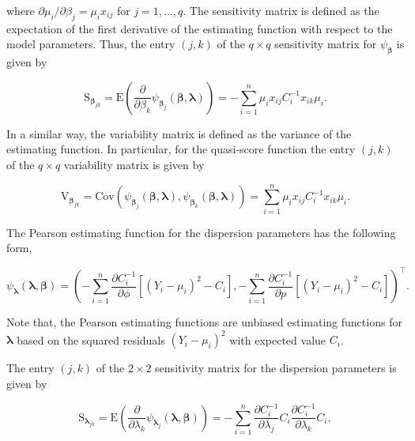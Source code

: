 \documentclass[9pt,a5paper,]{book}
\theoremstyle{definition}
\theoremstyle{definition}
\theoremstyle{remark}
\begin{document}
where \(\partial \mu_i/\partial \beta_j = \mu_i x_{ij}\) for
\(j = 1, \ldots, q\). The sensitivity matrix is defined as the
expectation of the first derivative of the estimating function with
respect to the model parameters. Thus, the entry \((j,k)\) of the
\(q \times q\) sensitivity matrix for \(\psi_{\boldsymbol{\beta}}\) is
given by

\begin{equation}
\mathrm{S}_{\boldsymbol{\beta}_{jk}} = \mathrm{E}\left ( \frac{\partial}{\partial \beta_k} \psi_{\boldsymbol{\beta}_j}(\boldsymbol{\beta}, \boldsymbol{\lambda})  \right ) = -\sum_{i=1}^n \mu_i x_{ij} C^{-1}_i x_{ik} \mu_i.
\label{eq:Sbeta}
\end{equation}

In a similar way, the variability matrix is defined as the variance of
the estimating function. In particular, for the quasi-score function the
entry \((j,k)\) of the \(q \times q\) variability matrix is given by

\begin{equation*}
\label{Vbeta}
\mathrm{V}_{\boldsymbol{\beta}_{jk}} = \mathrm{Cov}(\psi_{\boldsymbol{\beta}_j}(\boldsymbol{\beta}, \boldsymbol{\lambda}),\psi_{\boldsymbol{\beta}_k}(\boldsymbol{\beta}, \boldsymbol{\lambda})) = \sum_{i=1}^n \mu_i x_{ij} C^{-1}_i x_{ik} \mu_i.
\end{equation*}

The Pearson estimating function for the dispersion parameters has the
following form,

\begin{equation*}
\label{Pearson}
\psi_{\boldsymbol{\lambda}}(\boldsymbol{\lambda}, \boldsymbol{\beta}) = \left (-\sum_{i=1}^n \frac{\partial C^{-1}_i}{\partial \phi} \left [ (Y_i - \mu_i)^2 - C_i \right ], -\sum_{i=1}^n \frac{\partial C^{-1}_i}{\partial p}  \left [ (Y_i - \mu_i)^2 - C_i \right ]  \right )^\top.
\end{equation*}

Note that, the Pearson estimating functions are unbiased estimating
functions for \(\boldsymbol{\lambda}\) based on the squared residuals
\((Y_i - \mu_i)^2\) with expected value \(C_i\).

The entry \((j,k)\) of the \(2 \times 2\) sensitivity matrix for the
dispersion parameters is given by

\begin{equation}
\mathrm{S}_{\boldsymbol{\lambda}_{jk}} = \mathrm{E}\left ( \frac{\partial}{\partial \lambda_k}\psi_{\boldsymbol{\lambda}_j}(\boldsymbol{\lambda}, \boldsymbol{\beta})  \right ) = -\sum_{i=1}^n \frac{\partial C^{-1}_i}{\partial \lambda_j} C_i \frac{\partial C^{-1}_i}{\partial \lambda_k}C_i, 
\label{eq:Slambda}
\end{equation}
\end{document}
